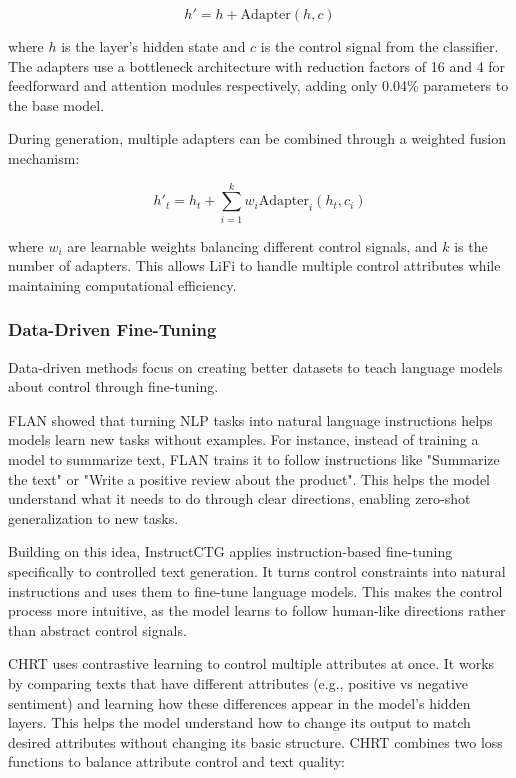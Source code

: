 \begin{equation}
    h' = h + \text{Adapter}(h, c)
\end{equation}

where $h$ is the layer's hidden state and $c$ is the control signal from the classifier. The adapters use a bottleneck architecture with reduction factors of 16 and 4 for feedforward and attention modules respectively, adding only 0.04\% parameters to the base model.

During generation, multiple adapters can be combined through a weighted fusion mechanism:

\begin{equation}
    h'_t = h_t + \sum_{i=1}^k w_i \text{Adapter}_i(h_t, c_i)
\end{equation}

where $w_i$ are learnable weights balancing different control signals, and $k$ is the number of adapters. This allows LiFi to handle multiple control attributes while maintaining computational efficiency.

\subsubsection{Data-Driven Fine-Tuning}

Data-driven methods focus on creating better datasets to teach language models about control through fine-tuning. 

FLAN \cite{wei2022finetunedlanguagemodelszeroshot} showed that turning NLP tasks into natural language instructions helps models learn new tasks without examples. 
For instance, instead of training a model to summarize text, FLAN trains it to follow instructions like "Summarize the text" or "Write a positive review about the product".
This helps the model understand what it needs to do through clear directions, enabling zero-shot generalization to new tasks.

Building on this idea, InstructCTG \cite{zhou2023controlledtextgenerationnatural} applies instruction-based fine-tuning specifically to controlled text generation. 
It turns control constraints into natural instructions and uses them to fine-tune language models. This makes the control process more intuitive, as the model learns to follow human-like directions rather than abstract control signals.

CHRT \cite{kumar-etal-2023-controlled} uses contrastive learning to control multiple attributes at once. 
It works by comparing texts that have different attributes (e.g., positive vs negative sentiment) and learning how these differences appear in the model's hidden layers. 
This helps the model understand how to change its output to match desired attributes without changing its basic structure.
CHRT combines two loss functions to balance attribute control and text quality:

